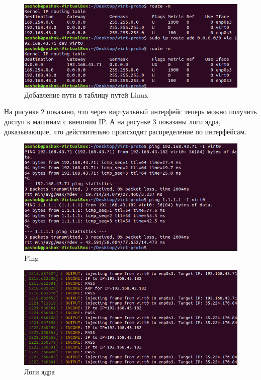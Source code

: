 \documentclass[14pt, a4paper]{extarticle}
\begin{document}
\begin{figure}[H]
	\centering
	\includegraphics[scale=0.8]{sett_route.png}
	\caption{Добавление пути в таблицу путей Linux}
	\label{sett_route}
\end{figure}

На рисунке \ref{ping} показано, что через виртуальный интерфейс теперь можно получить доступ к машинам с внешним IP. А на рисунке \ref{dmesg} показаны логи ядра, доказывающие, что действительно происходит распределение по интерфейсам.
\begin{figure}[H]
	\centering
	\includegraphics[scale=0.8]{ping.png}
	\caption{Ping}
	\label{ping}
\end{figure}

\begin{figure}[H]
	\centering
	\includegraphics[scale=0.7]{dmesg.png}
	\caption{Логи ядра}
	\label{dmesg}
\end{figure}
\end{document}
